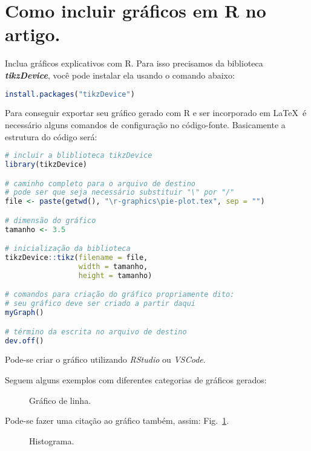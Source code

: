 \section{Como incluir gráficos em R no artigo.}

Inclua gráficos explicativos com R. Para isso precisamos da biblioteca \textit{\textbf{tikzDevice}}, você pode instalar ela usando o comando abaixo:

\begin{lstlisting}[language=R]
install.packages("tikzDevice")
\end{lstlisting}

Para conseguir exportar seu gráfico gerado com R e ser incorporado em \LaTeX\ é necessário alguns comandos de configuração no código-fonte. Basicamente a estrutura do código será:

\begin{lstlisting}[language=R]
# incluir a bliblioteca tikzDevice
library(tikzDevice)

# caminho completo para o arquivo de destino
# pode ser que seja necessário substituir "\" por "/"
file <- paste(getwd(), "\r-graphics\pie-plot.tex", sep = "")

# dimensão do gráfico
tamanho <- 3.5

# inicialização da biblioteca 
tikzDevice::tikz(filename = file,
                 width = tamanho,
                 height = tamanho)

# comandos para criação do gráfico propriamente dito:
# seu gráfico deve ser criado a partir daqui
myGraph()

# término da escrita no arquivo de destino
dev.off()
\end{lstlisting}

Pode-se criar o gráfico utilizando \textit{RStudio} ou \textit{VSCode}.

Seguem alguns exemplos com diferentes categorias de gráficos gerados:

\begin{figure}[H]
    \centering
    
    \caption{Gráfico de linha.}
    \label{graph:linha}
\end{figure}

Pode-se fazer uma citação ao gráfico também, assim: Fig.~\ref{graph:linha}.

\begin{figure}[H]
    \centering
    
    \caption{Histograma.}
    \label{graph:histograma}
\end{figure}



